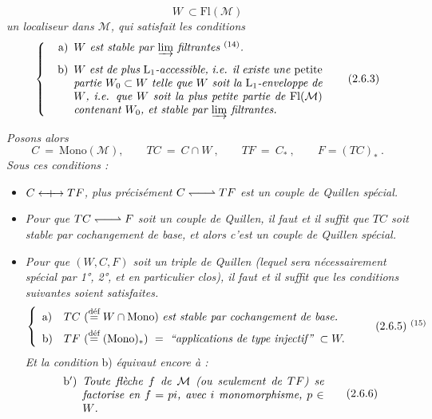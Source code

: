 \documentclass[11pt]{article}
\newcommand{\printedpage}[1]{\marginpar{\footnotesize p.~#1}}
\newcommand{\msp}[1]{\marginpar{\footnotesize [#1]}}
\newcommand{\deq}{\overset{\text{déf}}{=}}
\newcommand{\Mono}{\mathrm{Mono}}
\newcommand{\Fl}{\mathrm{Fl}}
\newcommand{\qpair}{\mathrel{\leftharpoondown\joinrel\relbar\joinrel\rightharpoonup}}
\newcommand{\Qcouple}{\mathrel{\leftarrow\mkern-9mu{+}\mkern-9mu\rightarrow}}
\begin{document}
\[ W \ \subset \Fl(\mathcal{M}) \tag*{(2.6.2)} \]
\textit{un localiseur dans $\mathcal{M}$, qui satisfait les conditions}
\[ \left\{ \begin{minipage}{0.72\textwidth}\itshape
\begin{itemize}[leftmargin=2.5em]
\item[\upshape a)] $W$ est stable par $\varinjlim$ filtrantes $^{\textup{(14)}}$.
\item[\upshape b)] $W$ est de plus $\mathrm{L}_1$-accessible, i.e. il existe une \textup{petite} partie $W_0 \subset W$ telle que $W$ soit la $\mathrm{L}_1$-enveloppe de $W$, i.e. que $W$ soit la plus petite partie de $\Fl(\mathcal{M})$ contenant $W_0$, et stable par $\varinjlim$ filtrantes. %
\end{itemize}
\end{minipage}\right. \tag*{(2.6.3)} \]

\printedpage{16}

\msp{page 26}
\textit{Posons alors}
\[ C \ = \ \Mono(\mathcal{M}), \qquad TC \ = \ C\cap W\ , \qquad TF \ = \ C_*\ , \qquad F = (TC)_*\ . \tag*{(2.6.4)} \]
\textit{Sous ces conditions :}
\begin{itemize}[leftmargin=2.5em]
\item[1°)] \textit{$C \Qcouple TF$, plus précisément $C \qpair TF$ est un couple de Quillen spécial.} %
\item[2°)] \textit{Pour que $TC \qpair F$ soit un couple de Quillen, il faut et il suffit que $TC$ soit stable par cochangement de base, et alors c'est un couple de Quillen spécial.} %
\item[3°)] \textit{Pour que $(W,C,F)$ soit un triple de Quillen (lequel sera nécessairement spécial par \textup{1°, 2°}, et en particulier clos), il faut et il suffit que les conditions suivantes soient satisfaites.}
\[ \left\{ \begin{array}{ll}
\text{a)} & TC\ (\deq W\cap\Mono)\ \text{\itshape est stable par cochangement de base.}\\[1ex]
\text{b)} & TF\ (\deq (\Mono)_*) \ = \ \text{\itshape “applications de type injectif”}\ \subset W.
\end{array}\right. \tag*{(2.6.5)~$^{(15)}$} \]
\textit{Et la condition} b) \textit{équivaut encore à :}
\[ \begin{minipage}{0.7\textwidth}
\begin{itemize}[leftmargin=2.5em]
\item[b$'$)] \textit{Toute flèche $f$ de $\mathcal{M}$ (ou seulement de $TF$) se factorise en $f = pi$, avec $i$ monomorphisme, $p \in W$.}
\end{itemize}
\end{minipage} \tag*{(2.6.6)} \]
\end{itemize}
\end{document}
